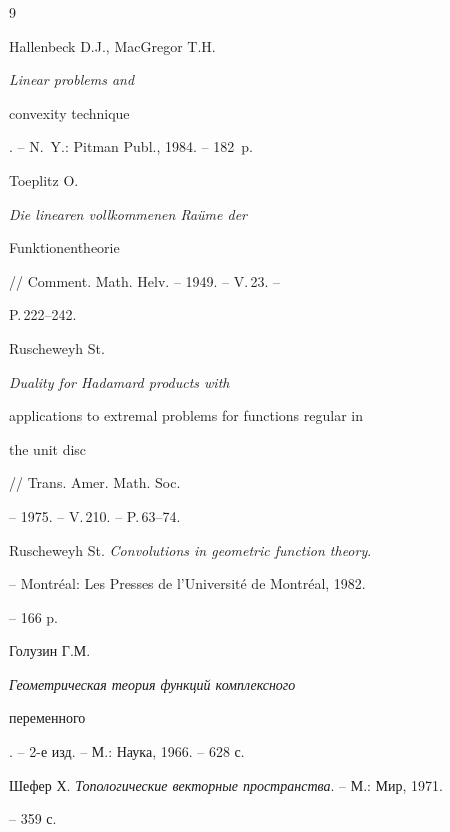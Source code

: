 \begin{thebibliography}{9}







Hallenbeck D.J., MacGregor T.H. {\em Linear problems and


convexity technique}. -- N.~Y.: Pitman Publ., 1984. -- 182~p.




Toeplitz O. {\em Die linearen vollkommenen Ra\"ume der 


Funktionentheorie} // Comment. Math. Helv. -- 1949. -- V.\,23. --


P.\,222--242.




Ruscheweyh St. {\em Duality for Hadamard products with 


applications to extremal problems for functions regular in 


the unit disc} // Trans. Amer. Math. Soc.


-- 1975. -- V.\,210. -- P.\,63--74.




Ruscheweyh St. {\em Convolutions in geometric function theory}.


-- Montr\'eal: Les Presses de l'Universit\'e de Montr\'eal, 1982.


-- 166 p.




Голузин Г.М. {\em Геометрическая теория функций комплексного


переменного}. -- 2-е изд. -- М.: Наука, 1966. -- 628 с.




Шефер Х. {\em Топологические векторные пространства}. -- М.: Мир, 1971. 


-- 359 с.





\end{thebibliography}





\vskip 2cm












\label{end}





